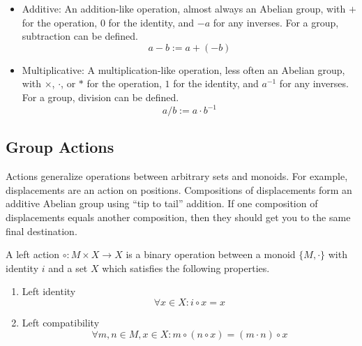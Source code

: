\begin{itemize}
	\item Additive: An addition-like operation, almost always an Abelian group, with $+$ for the operation, $0$ for the identity, and $-a$ for any inverses. For a group, subtraction can be defined.
	\begin{equation}
		a - b := a + (-b)
	\end{equation}
	\item Multiplicative: A multiplication-like operation, less often an Abelian group, with $\times$, $\cdot$, or $*$ for the operation, $1$ for the identity, and $a^{-1}$ for any inverses. For a group, division can be defined.
	\begin{equation}
		a / b := a \cdot b^{-1}
	\end{equation}
\end{itemize}

\subsection{Group Actions}

Actions generalize operations between arbitrary sets and monoids. For example, displacements are an action on positions. Compositions of displacements form an additive Abelian group using ``tip to tail'' addition. If one composition of displacements equals another composition, then they should get you to the same final destination.

\begin{definition}
	A left action $\circ: M \times X \rightarrow X$ is a binary operation between a monoid $\{ M, \cdot \}$ with identity $i$ and a set $X$ which satisfies the following properties.
	\begin{enumerate}
		\item Left identity
		\begin{equation}
			\forall x \in X: i \circ x = x
		\end{equation}
		\item Left compatibility
		\begin{equation}
			\forall m, n \in M, x \in X: m \circ (n \circ x) = (m \cdot n) \circ x
		\end{equation}
	\end{enumerate}
\end{definition}

